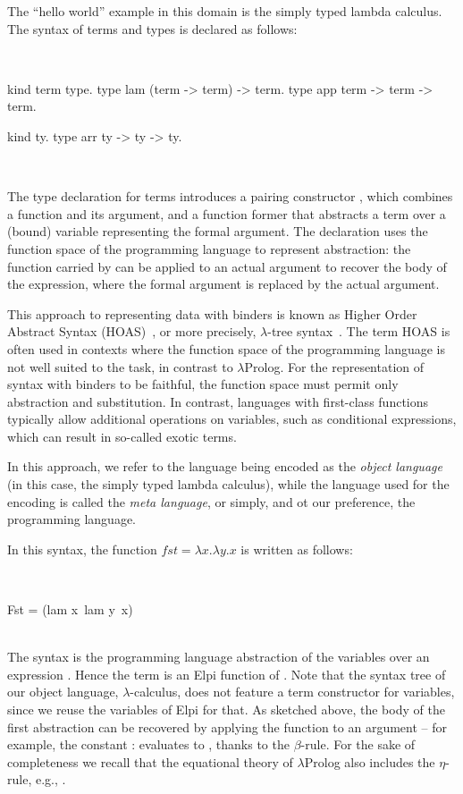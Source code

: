 \documentclass[a4paper, 11pt]{book}
\newenvironment{elpicode}
  {\VerbatimEnvironment~\\\begin{elpibox}\begin{xelpicode}}{\end{xelpicode}
\end{elpibox}\\}
\begin{document}
The ``hello world'' example in this domain is the simply typed lambda
calculus. %
The syntax of terms and types is declared as follows:

\begin{elpicode}
kind term type.
type lam (term -> term) -> term.
type app term -> term -> term.

kind ty.
type arr ty -> ty -> ty.
\end{elpicode}

The type declaration for terms introduces a pairing constructor ,
which combines a function and its argument, and a function former 
that abstracts a term over a (bound) variable representing the formal
argument. The declaration uses the function space of the programming language
to represent abstraction: the function carried by  can be applied to
an actual argument to recover the body of the expression, where the formal
argument is replaced by the actual argument.

This approach to representing data with binders is known as Higher Order
Abstract Syntax (HOAS)~\cite{10.1145/960116.54010}, or more precisely,
$\lambda$-tree syntax~\cite{Miller2018MechanizedMR}. The term HOAS is often
used in contexts where the function space of the programming language is not
well suited to the task, in contrast to $\lambda$Prolog. For the representation
of syntax with binders to be faithful, the function space must permit only
abstraction and substitution. In contrast, languages with first-class
functions typically allow
additional operations on variables, such as conditional expressions, which can result
in so-called exotic terms.

In this approach, we refer to the language being
encoded as the \emph{object language} (in this case, the simply typed lambda
calculus), while the language used for the encoding is called the \emph{meta language},
or simply, and ot our preference, the programming language.

In this syntax, the function $fst = \lambda x.\lambda y.x$ is written as
follows:

\begin{elpicode}
Fst = (lam x\ lam y\ x)
\end{elpicode}
The syntax  is the programming language abstraction of the
variables  over an expression . Hence
the term  is an Elpi function of . Note that
the syntax tree of our object language,
$\lambda$-calculus, does not feature a term constructor for variables, since
we reuse the variables of Elpi for that. As sketched above, the body of the first
abstraction can be recovered by applying the function to an argument -- for
example, the constant :  evaluates to
, thanks to the $\beta$-rule. For the sake of
completeness we recall that the equational theory of $\lambda$Prolog
also includes the $\eta$-rule, e.g., .
\end{document}
